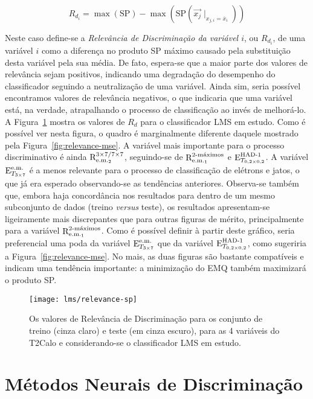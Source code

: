 \begin{equation}
R_{d_i} = \max(\text{SP}) - \max(\text{SP}(\overrightarrow{x_j}\mid_{x_{j,i} = \overline{x}_i}))
\label{eq:relevance-sp}
\end{equation}

Neste caso define-se a \textit{Relevância de Discriminação da variável $i$},
ou $R_{d_i}$, de uma variável $i$ como a diferença no produto SP máximo
causado pela substituição desta variável pela sua média. De fato, espera-se
que a maior parte dos valores de relevância sejam positivos, indicando uma
degradação do desempenho do classificador seguindo a neutralização de uma
variável. Ainda sim, seria possível encontramos valores de relevância
negativos, o que indicaria que uma variável está, na verdade, atrapalhando o
processo de classificação ao invés de melhorá-lo. A
Figura~\ref{fig:relevance-sp} mostra os valores de $R_d$ para o classificador
LMS em estudo. Como é possível ver nesta figura, o quadro é marginalmente
diferente daquele mostrado pela Figura~\ref{fig:relevance-mse}. A variável
mais importante para o processo discriminativo é ainda $\rcore$, seguindo-se
de $\eratio$ e $\ethad$. A variável $\etem$ é a menos relevante para o
processo de classificação de elétrons e jatos, o que já era esperado
observando-se as tendências anteriores. Observa-se também que, embora haja
concordância nos resultados para dentro de um mesmo subconjunto de dados
(treino \textit{versus} teste), os resultados apresentam-se ligeiramente mais
discrepantes que para outras figuras de mérito, principalmente para a
variável $\eratio$. Como é possível definir à partir deste gráfico, seria
preferencial uma poda da variável $\etem$ que da variável $\ethad$, como
sugeriria a Figura~\ref{fig:relevance-mse}. No mais, as duas figuras são
bastante compatíveis e indicam uma tendência importante: a minimização do EMQ
também maximizará o produto SP.

\begin{figure}
\begin{center}
\texttt{[image: lms/relevance-sp]}
\end{center}
\caption{Os valores de Relevância de Discriminação para os conjunto de treino
(cinza claro) e teste (em cinza escuro), para as 4 variáveis do T2Calo e
considerando-se o classificador LMS em estudo.}
\label{fig:relevance-sp}
\end{figure}

\section{Métodos Neurais de Discriminação}
\label{sec:neural}

